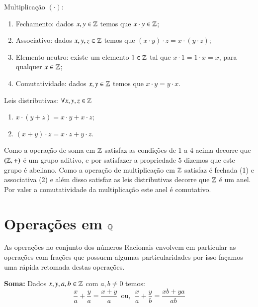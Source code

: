   Multiplicação $(\cdot)$:
 \begin{enumerate}[1)]
 \item Fechamento: dados $x, y \in \mathbb{Z}$ temos que $x \cdot y \in \mathbb{Z}$;
 \item Associativo: dados $x, y, z \in \mathbb{Z}$ temos que $(x \cdot y) \cdot z= x \cdot (y \cdot z)$;
 \item Elemento neutro: existe um elemento $1 \in \mathbb{Z}$ tal que $x \cdot 1= 1 \cdot x= x$, para qualquer $x \in \mathbb{Z}$;
 \item Comutatividade: dados $x, y \in \mathbb{Z}$ temos que $x \cdot y= y \cdot x$. 
 \end{enumerate}
 
  Leis distributivas: $\forall x, y, z \in \mathbb{Z}$
 \begin{enumerate}[1)]
 \item $x \cdot (y + z)= x \cdot y + x \cdot z$;
 \item $(x + y) \cdot z= x \cdot z + y \cdot z$.
 \end{enumerate}
 
  Como a operação de soma em $\mathbb{Z}$ satisfaz as condições de 1 a 4 acima decorre que $(\mathbb{Z}, +)$ é um grupo aditivo, e por satisfazer a propriedade 5 dizemos que este grupo é abeliano. Como a operação de multiplicação em $\mathbb{Z}$ satisfaz é fechada (1) e associativa (2) e além disso satisfaz as leis distributivas decorre que $\mathbb{Z}$ é um anel. Por valer a comutatividade da multiplicação este anel é comutativo.  


 \section{Operações em \texorpdfstring{$\mathbb{Q}$}{Q}}

 As operações no conjunto dos números Racionais envolvem em particular as operações com frações que possuem algumas particularidades por isso façamos uma rápida retomada destas operações.

 \vskip0.3cm

 \colorbox{azul}{
 \begin{minipage}{0.9\linewidth}
 \begin{center}
  \textbf{Soma:} Dados $x, y, a, b \in \mathbb{Z}$ com $a, b \neq 0$ temos:
 \[\frac{x}{a} + \frac{y}{a}= \frac{x+y}{a} \, \text{ ou}, \ \
  \frac{x}{a} + \frac{y}{b}= \frac{xb + ya}{ab} \]
 \end{center}
 \end{minipage}}

 \vskip0.3cm

